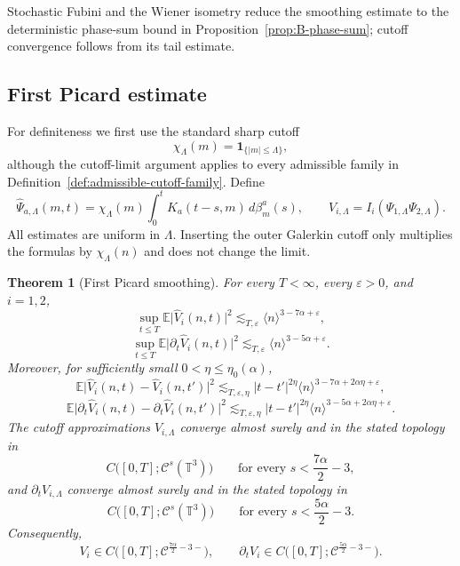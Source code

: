 \documentclass[10pt]{amsart}
\numberwithin{equation}{section}
\theoremstyle{plain}
\newtheorem{theorem}{Theorem}[section]
\theoremstyle{definition}
\theoremstyle{remark}
\newcommand{\T}{\mathbb{T}}
\newcommand{\E}{\mathbb{E}}
\newcommand{\C}{\mathcal{C}}
\newcommand{\eps}{\varepsilon}
\newcommand{\la}{\langle}
\newcommand{\ra}{\rangle}
\begin{document}
Stochastic Fubini and the Wiener isometry reduce the smoothing estimate to the deterministic phase-sum bound in Proposition~\ref{prop:B-phase-sum}; cutoff convergence follows from its tail estimate.

\subsection{First Picard estimate}

For definiteness we first use the standard sharp cutoff
\[
        \chi_\Lambda(m)=\mathbf 1_{\{|m|\le\Lambda\}},
\]
although the cutoff-limit argument applies to every admissible family in Definition~\ref{def:admissible-cutoff-family}.  Define
\[
        \widehat\Psi_{a,\Lambda}(m,t)
        =
        \chi_\Lambda(m)
        \int_0^t K_a(t-s,m)\,d\beta_m^a(s),
        \qquad
        V_{i,\Lambda}=I_i(\Psi_{1,\Lambda}\Psi_{2,\Lambda}).
\]
All estimates are uniform in \(\Lambda\).  Inserting the outer Galerkin cutoff only multiplies the formulas by \(\chi_\Lambda(n)\) and does not change the limit.

\begin{theorem}[First Picard smoothing]\label{thm:B-first-picard}
For every \(T<\infty\), every \(\eps>0\), and \(i=1,2\),
\begin{equation}\label{B:fixed-V}
        \sup_{t\le T}\E\bigl|\widehat V_i(n,t)\bigr|^2
        \lesssim_{T,\eps}
        \la n\ra^{3-7\alpha+\eps},
\end{equation}
\begin{equation}\label{B:fixed-dtV}
        \sup_{t\le T}\E\bigl|\partial_t\widehat V_i(n,t)\bigr|^2
        \lesssim_{T,\eps}
        \la n\ra^{3-5\alpha+\eps}.
\end{equation}
Moreover, for sufficiently small \(0<\eta\le\eta_0(\alpha)\),
\begin{equation}\label{B:incr-V}
        \E\bigl|\widehat V_i(n,t)-\widehat V_i(n,t')\bigr|^2
        \lesssim_{T,\eps,\eta}
        |t-t'|^{2\eta}\la n\ra^{3-7\alpha+2\alpha\eta+\eps},
\end{equation}
\begin{equation}\label{B:incr-dtV}
        \E\bigl|\partial_t\widehat V_i(n,t)-\partial_t\widehat V_i(n,t')\bigr|^2
        \lesssim_{T,\eps,\eta}
        |t-t'|^{2\eta}\la n\ra^{3-5\alpha+2\alpha\eta+\eps}.
\end{equation}
The cutoff approximations \(V_{i,\Lambda}\) converge almost surely and in the stated topology in
\[
        C\bigl([0,T];\C^s(\T^3)\bigr)
        \qquad
        \text{for every } s<\frac{7\alpha}{2}-3,
\]
and \(\partial_tV_{i,\Lambda}\) converge almost surely and in the stated topology in
\[
        C\bigl([0,T];\C^s(\T^3)\bigr)
        \qquad
        \text{for every } s<\frac{5\alpha}{2}-3.
\]
Consequently,
\[
        V_i\in C\bigl([0,T];\C^{\frac{7\alpha}{2}-3-}\bigr),
        \qquad
        \partial_tV_i\in C\bigl([0,T];\C^{\frac{5\alpha}{2}-3-}\bigr).
\]
\end{theorem}
\end{document}
